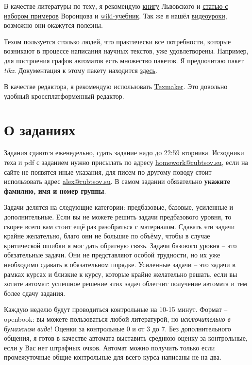 \documentclass[12pt]{article}
\theoremstyle{definiton}
\theoremstyle{definition}
\theoremstyle{definition}
\begin{document}
	В качестве литературы по теху, я рекомендую \href{ftp://ftp.mccme.ru/pub/tex/lvovsky-newbook/pdf.zip}{книгу} Львовского  и \href{http://www.ccas.ru/voron/download/voron05latex.pdf}{статью с набором примеров} Воронцова и \href{http://en.wikibooks.org/wiki/LaTeX/}{wiki-учебник}. Так же я нашёл \href{http://www.youtube.com/ShareLaTeX}{видеоуроки}, возможно они окажутся полезны.

	Техом пользуется столько людей, что практически все потребности, которые возникают в процессе написания научных текстов, уже удовлетворены. Например, для построения графов автоматов есть множество пакетов. Я предпочитаю пакет \emph{tikz}. Документация к этому пакету находится \href{http://ctan.usu.ru/graphics/pgf/base/doc/generic/pgf/pgfmanual.pdf}{здесь}.

	В качестве редактора, я рекомендую использовать \href{http://www.xm1math.net/texmaker/}{Texmaker}. Это довольно удобный кроссплатформенный редактор.

	\section{О заданиях}

	Задания сдаются еженедельно, сдать задание надо до 22:59 вторника. Исходники теха и pdf с заданием нужно присылать по адресу \href{mailto:homework@rubtsov.su}{homework@rubtsov.su}, если на сайте не появятся иные указания, для писем по другому поводу стоит использовать адрес \href{mailto:alex@rubtsov.su}{alex@rubtsov.su}. В самом задании обязательно \textbf{укажите фамилию, имя и номер группы}.

	Задачи делятся на следующие категории: предбазовые, базовые, усиленные и дополнительные. Если вы не можете решить задачи предбазового уровня, то скорее всего вам стоит ещё раз разобраться с материалом. Сдавать эти задачи крайне желательно, благо они не большие по объёму, чтобы в случае критической ошибки я мог дать обратную связь. Задачи базового уровня -- это обязательные задачи. Они не представляют особой трудности, но их уже необходимо сдавать в обязательном порядке. Усиленные задачи -- это задачи в рамках курсах и близкие к курсу, которые крайне желательно решать, если вы хотите автомат: успешное решение этих задач облегчит получение автомата и тем более сдачу задания.


	Каждую неделю будут проводиться контрольные на 10-15 минут. Формат -- openbook: вы можете пользоваться любой литературой, но \emph{исключительно в бумажном виде}! Оценки за контрольные $0$ и от $3$ до $7$. Без дополнительного общения, я готов в качестве автомата выставить среднюю оценку за контрольные, если у Вас нет штрафных очков. Автомат можно получить только если промежуточные общие контрольные для всего курса написаны не на два.
\end{document}
